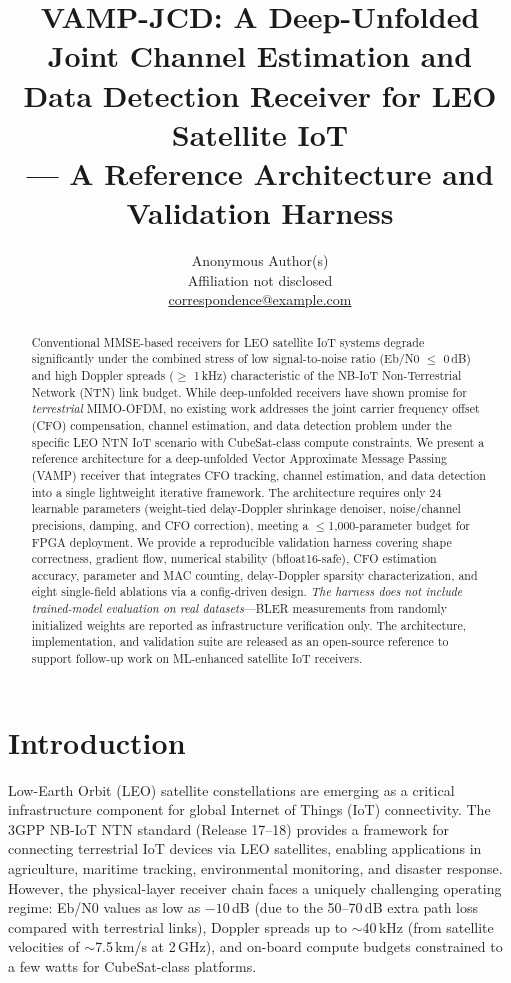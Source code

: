 \documentclass{article}
\title{VAMP-JCD: A Deep-Unfolded Joint Channel Estimation and\\Data Detection Receiver for LEO Satellite IoT\\
--- A Reference Architecture and Validation Harness}
\author{Anonymous Author(s)\\
Affiliation not disclosed\\
\href{mailto:correspondence@example.com}{correspondence@example.com}}
\begin{document}
\maketitle

\begin{abstract}
Conventional MMSE-based receivers for LEO satellite IoT systems degrade significantly under the combined stress of low signal-to-noise ratio (Eb/N0 $\leq$ 0\,dB) and high Doppler spreads ($\geq$ 1\,kHz) characteristic of the NB-IoT Non-Terrestrial Network (NTN) link budget. While deep-unfolded receivers have shown promise for \emph{terrestrial} MIMO-OFDM, no existing work addresses the joint carrier frequency offset (CFO) compensation, channel estimation, and data detection problem under the specific LEO NTN IoT scenario with CubeSat-class compute constraints. We present a reference architecture for a deep-unfolded Vector Approximate Message Passing (VAMP) receiver that integrates CFO tracking, channel estimation, and data detection into a single lightweight iterative framework. The architecture requires only 24 learnable parameters (weight-tied delay-Doppler shrinkage denoiser, noise/channel precisions, damping, and CFO correction), meeting a $\leq$1,000-parameter budget for FPGA deployment. We provide a reproducible validation harness covering shape correctness, gradient flow, numerical stability (bfloat16-safe), CFO estimation accuracy, parameter and MAC counting, delay-Doppler sparsity characterization, and eight single-field ablations via a config-driven design. \emph{The harness does not include trained-model evaluation on real datasets}---BLER measurements from randomly initialized weights are reported as infrastructure verification only. The architecture, implementation, and validation suite are released as an open-source reference to support follow-up work on ML-enhanced satellite IoT receivers.
\end{abstract}

\section{Introduction}

Low-Earth Orbit (LEO) satellite constellations are emerging as a critical infrastructure component for global Internet of Things (IoT) connectivity. The 3GPP NB-IoT NTN standard (Release 17--18) provides a framework for connecting terrestrial IoT devices via LEO satellites, enabling applications in agriculture, maritime tracking, environmental monitoring, and disaster response. However, the physical-layer receiver chain faces a uniquely challenging operating regime: Eb/N0 values as low as $-10$\,dB (due to the 50--70\,dB extra path loss compared with terrestrial links), Doppler spreads up to $\sim$40\,kHz (from satellite velocities of $\sim$7.5\,km/s at 2\,GHz), and on-board compute budgets constrained to a few watts for CubeSat-class platforms.
\end{document}
